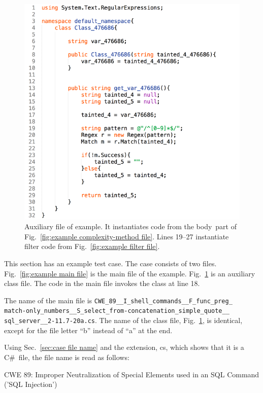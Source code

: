 \documentclass[12pt]{article}
\newcommand{\CSharp}{C{\fontseries{b}\selectfont\#}}
\begin{document}
\begin{figure}[htbp]
  \includegraphics[width=0.85\linewidth]{fig_example_code2.png}
  \caption{Auxiliary file of example.  It instantiates code from the
    \texlangle body\texrangle\ part of Fig.~\ref{fig:example complexity-method file}.
    Lines 19--27 instantiate filter code
    from Fig.~\ref{fig:example filter file}.}
  \label{fig:example aux file}
\end{figure}

This section has an example test case.  The case consists of 
two files.
Fig.~\ref{fig:example main file} is the main file of the example.  
Fig.~\ref{fig:example aux file} is an auxiliary class file.  
The code in
the main file invokes the class at line 18.

The name of the main file is
\verb|CWE_89__I_shell_commands__F_func_preg_| \\
\verb|match-only_numbers__S_select_from-concatenation_simple_quote__| \\
\verb|sql_server__2-11.7-20a.cs|.
The name of the class file, Fig.~\ref{fig:example aux file}, is
identical, except for the
file letter ``b'' instead of ``a'' at the end.

Using Sec.~\ref{sec:case file name} and the extension, cs, which shows that it is a
\CSharp\ file, the file name is read as follows:

\noindent CWE 89: Improper Neutralization of Special Elements used in an SQL Command
('SQL Injection') \cite{CWE89}
\end{document}
